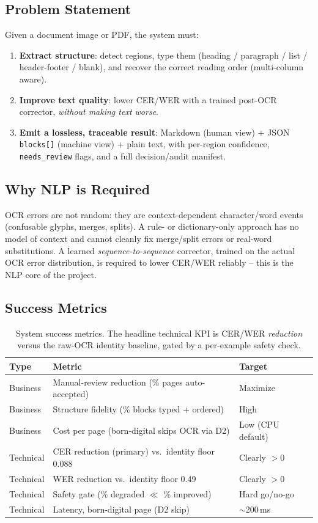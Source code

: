 \documentclass[12pt,a4paper]{article}
\begin{document}
\subsection{Problem Statement}

Given a document image or PDF, the system must:
\begin{enumerate}
  \item \textbf{Extract structure}: detect regions, type them (heading / paragraph / list / header-footer / blank), and recover the correct reading order (multi-column aware).
  \item \textbf{Improve text quality}: lower CER/WER with a trained post-OCR corrector, \emph{without making text worse}.
  \item \textbf{Emit a lossless, traceable result}: Markdown (human view) + JSON \texttt{blocks[]} (machine view) + plain text, with per-region confidence, \texttt{needs\_review} flags, and a full decision/audit manifest.
\end{enumerate}

\subsection{Why NLP is Required}

OCR errors are not random: they are context-dependent character/word events (confusable glyphs, merges, splits). A rule- or dictionary-only approach has no model of context and cannot cleanly fix merge/split errors or real-word substitutions. A learned \emph{sequence-to-sequence} corrector, trained on the actual OCR error distribution, is required to lower CER/WER reliably -- this is the NLP core of the project.

\subsection{Success Metrics}

\begin{table}[H]
\centering
\caption{System success metrics. The headline technical KPI is CER/WER \emph{reduction} versus the raw-OCR identity baseline, gated by a per-example safety check.}
\begin{tabular}{lll}
\toprule
\textbf{Type} & \textbf{Metric} & \textbf{Target} \\
\midrule
Business  & Manual-review reduction (\% pages auto-accepted) & Maximize \\
Business  & Structure fidelity (\% blocks typed + ordered) & High \\
Business  & Cost per page (born-digital skips OCR via D2) & Low (CPU default) \\
Technical & CER reduction (primary) vs.\ identity floor 0.088 & Clearly $>$0 \\
Technical & WER reduction vs.\ identity floor 0.49 & Clearly $>$0 \\
Technical & Safety gate (\% degraded $\ll$ \% improved) & Hard go/no-go \\
Technical & Latency, born-digital page (D2 skip) & $\sim$200\,ms \\
\bottomrule
\end{tabular}
\end{table}
\end{document}
